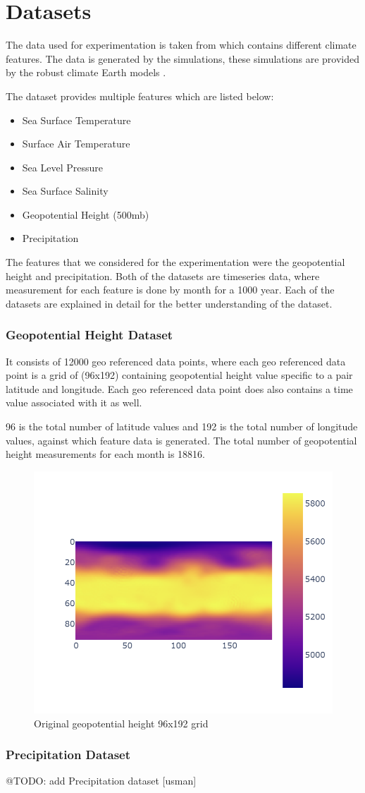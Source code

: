 
\clearpage
\cleardoublepage

\chapter{Datasets}
\label{chap:dataset}

The data used for experimentation is taken from \cite{willi_rath_2023_7779883} which contains different climate features. The data is generated by the simulations, these simulations are provided by the robust climate Earth models \cite{willi_rath_2023_7779883}.

The dataset provides multiple features which are listed below:
\begin{itemize}
    \item Sea Surface Temperature
    \item Surface Air Temperature
    \item Sea Level Pressure
    \item Sea Surface Salinity
    \item Geopotential Height (500mb)
    \item Precipitation
\end{itemize}

The features that we considered for the experimentation were the geopotential height and precipitation.
Both of the datasets are timeseries data, where measurement for each feature is done by month for a 1000 year. Each of the datasets are explained in detail for the better understanding of the dataset.
\newpage
\subsection{Geopotential Height Dataset}
It consists of 12000 geo referenced data points, where each geo referenced data point is a grid of (96x192) containing geopotential height value specific to a pair latitude and longitude.
Each geo referenced data point does also contains a time value associated with it as well.

96  is the total number of latitude values and  192 is the total number of longitude values, against which feature data is generated. The total number of geopotential height measurements for each month is 18816.

\begin{figure}[h]
    \centering
    \includegraphics[width=0.6\linewidth]{figures/chapter-5/data_original.png}
    \caption{Original geopotential height 96x192 grid }
    \label{fig:org_geopoth}
\end{figure}

\subsection{Precipitation Dataset}

@TODO: add Precipitation dataset [usman]